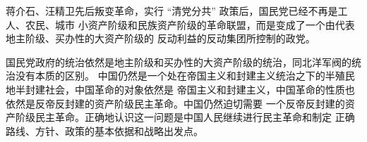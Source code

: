 \documentclass[10pt, UTF8]{book} %
\begin{document}
蒋介石、汪精卫先后叛变革命，实行 “清党分共” 政策后，国民党已经不再是工人、农民、城市
小资产阶级和民族资产阶级的革命联盟，而是变成了一个由代表地主阶级、买办性的大资产阶级的
反动利益的反动集团所控制的政党。


国民党政府的统治依然是地主阶级和买办性的大资产阶级的统治，同北洋军阀的统治没有本质的区别。
中国仍然是一个处在帝国主义和封建主义统治之下的半殖民地半封建社会，中国革命的对象依然是
帝国主义和封建主义，中国革命的性质也依然是反帝反封建的资产阶级民主革命。中国仍然迫切需要
一个反帝反封建的资产阶级民主革命。正确地认识这一问题是中国人民继续进行民主革命和制定
正确路线、方针、政策的基本依据和战略出发点。




\end{document}
